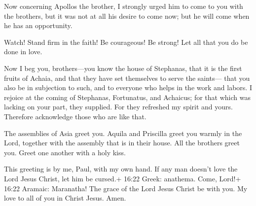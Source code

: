  Now concerning Apollos the brother, I strongly urged him
to come to you with the brothers, but it was not at all his desire to
come now; but he will come when he has an opportunity.

 Watch! Stand firm in the faith! Be courageous! Be strong!
 Let all that you do be done in love.

 Now I beg you, brothers---you know the house of Stephanas,
that it is the first fruits of Achaia, and that they have set themselves
to serve the saints---  that you also be in subjection to
such, and to everyone who helps in the work and labors.  I
rejoice at the coming of Stephanas, Fortunatus, and Achaicus; for that
which was lacking on your part, they supplied.  For they
refreshed my spirit and yours. Therefore acknowledge those who are like
that.

 The assemblies of Asia greet you. Aquila and Priscilla
greet you warmly in the Lord, together with the assembly that is in
their house.  All the brothers greet you. Greet one another
with a holy kiss.

 This greeting is by me, Paul, with my own hand.
 If any man doesn't love the Lord Jesus Christ, let him be
cursed.+ 16:22 Greek: anathema. Come, Lord!+ 16:22 Aramaic: Maranatha!
 The grace of the Lord Jesus Christ be with you.
 My love to all of you in Christ Jesus. Amen.
